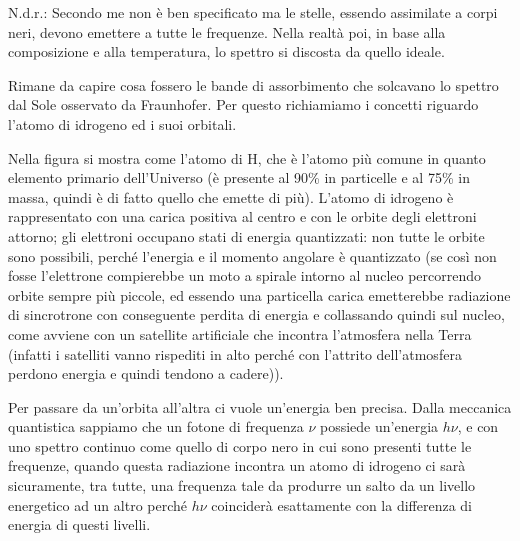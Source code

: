 \vspace{0.2cm}N.d.r.: Secondo me non è ben specificato ma le stelle, essendo assimilate a corpi neri, devono emettere a tutte le frequenze. Nella realtà poi, in base alla composizione e alla temperatura, lo spettro si discosta da quello ideale. 

\vspace{0.2cm}Rimane da capire cosa fossero le bande di assorbimento che solcavano lo spettro dal Sole osservato da Fraunhofer. Per questo richiamiamo i concetti riguardo l'atomo di idrogeno ed i suoi orbitali.

Nella figura si mostra come l'atomo di H, che è l'atomo più comune in quanto elemento primario dell'Universo (è presente al 90\% in particelle e al 75\% in massa, quindi è di fatto quello che emette di più). L'atomo di idrogeno è rappresentato con una carica positiva al centro e con le orbite degli elettroni attorno; gli elettroni occupano stati di energia quantizzati: non tutte le orbite sono possibili, perché l'energia e il momento angolare è quantizzato (se così non fosse l'elettrone compierebbe un moto a spirale intorno al nucleo percorrendo orbite sempre più piccole, ed essendo una particella carica emetterebbe radiazione di sincrotrone con conseguente perdita di energia e collassando quindi sul nucleo, come avviene con un satellite artificiale che incontra l'atmosfera nella Terra (infatti i satelliti vanno rispediti in alto perché con l'attrito dell'atmosfera perdono energia e quindi tendono a cadere)).

Per passare da un'orbita all'altra ci vuole un'energia ben precisa. Dalla meccanica quantistica sappiamo che un fotone di frequenza $\nu$ possiede un'energia $h\nu$, e con uno spettro continuo come quello di corpo nero in cui sono presenti tutte le frequenze, quando questa radiazione incontra un atomo di idrogeno ci sarà sicuramente, tra tutte, una frequenza tale da produrre un salto da un livello energetico ad un altro perché $h \nu$ coinciderà esattamente con la differenza di energia di questi livelli. 

